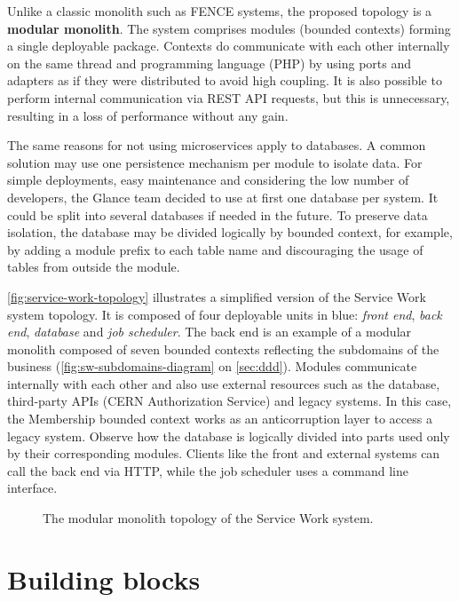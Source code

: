Unlike a classic monolith such as FENCE systems, the proposed topology is a \textbf{modular monolith}. The system comprises modules (bounded contexts) forming a single deployable package. Contexts do communicate with each other internally on the same thread and programming language (PHP) by using ports and adapters as if they were distributed to avoid high coupling. It is also possible to perform internal communication via REST API requests, but this is unnecessary, resulting in a loss of performance without any gain.

The same reasons for not using microservices apply to databases. A common solution may use one persistence mechanism per module to isolate data. For simple deployments, easy maintenance and considering the low number of developers, the Glance team decided to use at first one database per system. It could be split into several databases if needed in the future. To preserve data isolation, the database may be divided logically by bounded context, for example, by adding a module prefix to each table name and discouraging the usage of tables from outside the module.

\autoref{fig:service-work-topology} illustrates a simplified version of the Service Work system topology. It is composed of four deployable units in blue: \textit{front end}, \textit{back end}, \textit{database} and \textit{job scheduler}. The back end is an example of a modular monolith composed of seven bounded contexts reflecting the subdomains of the business (\autoref{fig:sw-subdomains-diagram} on \autoref{sec:ddd}). Modules communicate internally with each other and also use external resources such as the database, third-party APIs (CERN Authorization Service) and legacy systems. In this case, the Membership bounded context works as an anticorruption layer \cite{ddd-blue-book} to access a legacy system. Observe how the database is logically divided into parts used only by their corresponding modules. Clients like the front and external systems can call the back end via HTTP, while the job scheduler uses a command line interface.

\begin{figure}[htbp]
  \centering
  
  \caption{The modular monolith topology of the Service Work system.}
  \label{fig:service-work-topology}
\end{figure}

\section{Building blocks}
\label{sec:building-blocks}

